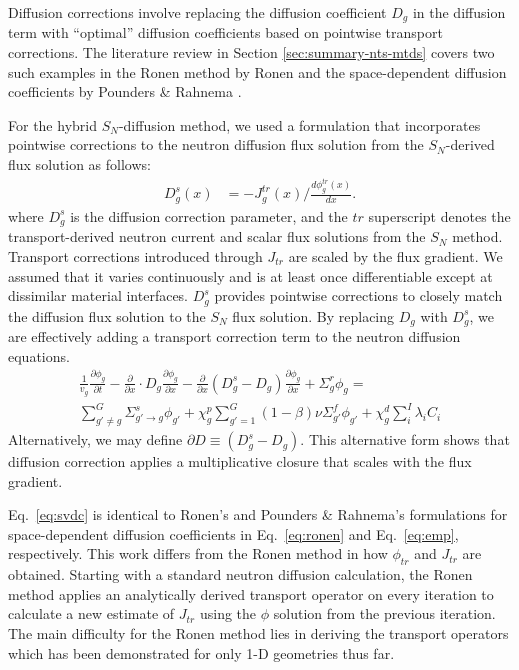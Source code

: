Diffusion corrections involve replacing the diffusion coefficient $D_g$ in the
diffusion term with ``optimal'' diffusion coefficients based on
pointwise transport corrections. The literature review in Section \ref{sec:summary-nts-mtds} covers
two such
examples in the Ronen method by Ronen \cite{ronen_accurate_2004} and the space-dependent diffusion
coefficients by Pounders \& Rahnema \cite{pounders_diffusion_2009}.

For the hybrid $S_N$-diffusion method, we used a formulation that incorporates pointwise
corrections to the neutron diffusion flux solution from the $S_N$-derived flux solution as follows:
%
\begin{align}
  D^s_g(x) &= -J^{tr}_g(x)\bigg/\frac{d\phi^{tr}_g(x)}{dx}. \label{eq:svdc}
\end{align}
%
where $D^s_g$ is the diffusion correction parameter, and the $tr$ superscript denotes the
transport-derived neutron
current and scalar flux solutions from the $S_N$ method. Transport corrections introduced through
$J_{tr}$ are scaled by the flux gradient. We assumed that it varies continuously and is
at least once differentiable except at dissimilar material interfaces. $D^s_g$ provides
pointwise corrections to closely match the diffusion flux solution to the $S_N$ flux solution.
By replacing $D_g$ with $D^s_g$, we are effectively adding a transport correction term to the
neutron diffusion equations.
%
\begin{multline}
  \frac{1}{v_g} \frac{\partial \phi_g}{\partial t} - \frac{\partial}{\partial x} \cdot D_g
  \frac{\partial \phi_g}{\partial x} 
  -\frac{\partial}{\partial x}(D^s_g-D_g)\frac{\partial\phi_g}{\partial x}
  + \Sigma^r_g \phi_g = \\
  \sum^G_{g' \neq g} \Sigma^s_{g' \rightarrow g} \phi_{g'}
  + \chi^p_g \sum^G_{g'=1} \left( 1-\beta \right) \nu \Sigma^f_{g'}
  \phi_{g'} + \chi^d_g \sum^I_i \lambda_i C_i \label{eq:neutron-diffusion-correction} %
\end{multline}
Alternatively, we may define
$\partial D\equiv\left(D^s_g-D_g\right)$. This alternative form shows that diffusion
correction applies a multiplicative closure that scales with the flux gradient.

Eq.\ \ref{eq:svdc} is identical to Ronen's \cite{ronen_accurate_2004} and Pounders \& Rahnema's
\cite{pounders_diffusion_2009} formulations for space-dependent diffusion coefficients in Eq.\
\ref{eq:ronen} and Eq.\ \ref{eq:emp}, respectively. This work differs from the Ronen method in how
$\phi_{tr}$ and $J_{tr}$ are obtained. Starting with
a standard neutron diffusion calculation, the Ronen method applies an analytically derived
transport operator on every iteration to calculate a new estimate of $J_{tr}$ using the $\phi$
solution from the previous iteration. The main difficulty for the Ronen method lies in deriving the
transport operators which has been demonstrated for only 1-D geometries thus far.

